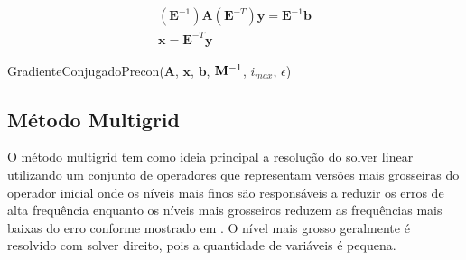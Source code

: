 \begin{align} \label{eq:esqdirpreconcg}
(\mathbf{E}^{-1})\mathbf{A}(\mathbf{E}^{-T}) \mathbf{y} = \mathbf{E}^{-1}\mathbf{b} \\
\mathbf{x} = \mathbf{E}^{-T} \mathbf{y}
\end{align}





\vspace{1cm}
\begin{algorithm}[H]
\caption{GradienteConjugadoPrecon($\mathbf{A}$, $\mathbf{x}$, $\mathbf{b}$, $\mathbf{M}^{-1}$, $i_{max}$, $\epsilon$)}
\label{alg:algoritmocgprecon}
\end{algorithm}
\vspace{1cm}


\subsection{Método Multigrid}

O método multigrid tem como ideia principal a resolução do solver linear utilizando um conjunto de operadores que representam versões mais grosseiras do operador inicial onde os níveis mais finos são responsáveis a reduzir os erros de alta frequência enquanto os níveis mais grosseiros reduzem as frequências mais baixas do erro conforme mostrado em \citet{multigridtutorial}. O nível mais grosso geralmente é resolvido com solver direito, pois a quantidade de variáveis é pequena. 

